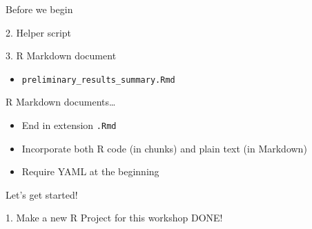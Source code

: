 \documentclass[
  ignorenonframetext,
]{beamer}
\providecommand{\tightlist}{%
  \setlength{\itemsep}{0pt}\setlength{\parskip}{0pt}}
\begin{document}
\begin{frame}[fragile]{Before we begin}
\begin{block}{2. Helper script}
\end{block}

\begin{block}{3. R Markdown document}

\begin{itemize}
\tightlist
\item
  \texttt{preliminary\_results\_summary.Rmd}
\end{itemize}

\begin{block}{R Markdown documents\ldots{}}

\begin{itemize}
\tightlist
\item
  End in extension \texttt{.Rmd}
\item
  Incorporate both R code (in chunks) and plain text (in Markdown)
\item
  Require YAML at the beginning
\end{itemize}

\end{block}

\end{block}

\end{frame}

\begin{frame}{Let's get started!}
\protect\hypertarget{lets-get-started}{}

\end{frame}

\begin{frame}{1. Make a new R Project for this workshop \textbar{}
DONE!}
\protect\hypertarget{make-a-new-r-project-for-this-workshop-done}{}

\end{frame}
\end{document}
